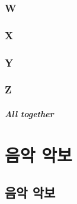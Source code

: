\documentclass[12pt, a4paper, oneside]{book}
\let\stdsection\section
\renewcommand\section{\newpage\stdsection}
\begin{document}
	\subsection{W}

	\subsection{X}

	\subsection{Y}

	\subsection{Z}








\paragraph{All together}





	\chapter{음악 악보}
	\noptcrule
	\parttoc				

	\section{음악 악보}




\end{document}
